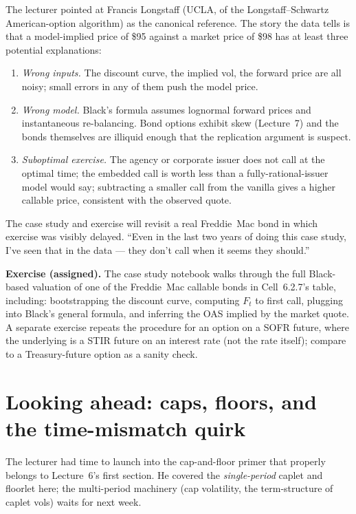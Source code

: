 The lecturer pointed at Francis Longstaff (UCLA, of the Longstaff--Schwartz
American-option algorithm) as the canonical reference. The story the
data tells is that a model-implied price of \$95 against a market
price of \$98 has at least three potential explanations:
\begin{enumerate}[label=(\arabic*)]
  \item \emph{Wrong inputs.} The discount curve, the implied vol, the
        forward price are all noisy; small errors in any of them push
        the model price.
  \item \emph{Wrong model.} Black's formula assumes lognormal forward
        prices and instantaneous re-balancing. Bond options exhibit
        skew (Lecture~7) and the bonds themselves are illiquid enough
        that the replication argument is suspect.
  \item \emph{Suboptimal exercise.} The agency or corporate issuer
        does not call at the optimal time; the embedded call is worth
        less than a fully-rational-issuer model would say; subtracting
        a smaller call from the vanilla gives a higher callable price,
        consistent with the observed quote.
\end{enumerate}
The case study and exercise will revisit a real Freddie~Mac bond in
which exercise was visibly delayed. ``Even in the last two years of
doing this case study, I've seen that in the data --- they don't call
when it seems they should.''

\begin{exerciseblock}
\textbf{Exercise (assigned).} The case study notebook walks through
the full Black-based valuation of one of the Freddie~Mac callable
bonds in Cell~6.2.7's table, including: bootstrapping the discount
curve, computing $F_t$ to first call, plugging into Black's general
formula, and inferring the OAS implied by the market quote. A separate
exercise repeats the procedure for an option on a SOFR future, where
the underlying is a STIR future on an interest rate (not the rate
itself); compare to a Treasury-future option as a sanity check.
\end{exerciseblock}

\section{Looking ahead: caps, floors, and the time-mismatch quirk}\label{L5-sec:caps}

The lecturer had time to launch into the cap-and-floor primer that
properly belongs to Lecture~6's first section. He covered the
\emph{single-period} caplet and floorlet here; the multi-period
machinery (cap volatility, the term-structure of caplet vols) waits
for next week.

